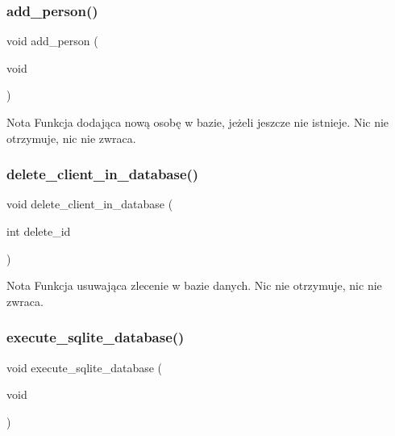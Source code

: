 \subsubsection{add\_person()}
{\footnotesize\ttfamily void add\+\_\+person (\begin{DoxyParamCaption}\item[{void}]{ }\end{DoxyParamCaption})}


\begin{DoxyCode}{0}
\end{DoxyCode}
 \begin{DoxyNote}{Nota}
Funkcja dodająca nową osobę w bazie, jeżeli jeszcze nie istnieje. Nic nie otrzymuje, nic nie zwraca. 
\end{DoxyNote}
\mbox{\label{client__management_8cpp_ad13e406fc947e4387ee34bb9ee78f5c2}} 
\subsubsection{delete\_client\_in\_database()}
{\footnotesize\ttfamily void delete\+\_\+client\+\_\+in\+\_\+database (\begin{DoxyParamCaption}\item[{int}]{delete\+\_\+id }\end{DoxyParamCaption})}


\begin{DoxyCode}{0}
\end{DoxyCode}
 \begin{DoxyNote}{Nota}
Funkcja usuwająca zlecenie w bazie danych. Nic nie otrzymuje, nic nie zwraca. 
\end{DoxyNote}
\mbox{\label{client__management_8cpp_a9b61cf3bf58fc7b4fc02e97d948d04c3}} 
\subsubsection{execute\_sqlite\_database()}
{\footnotesize\ttfamily void execute\+\_\+sqlite\+\_\+database (\begin{DoxyParamCaption}\item[{void}]{ }\end{DoxyParamCaption})}


